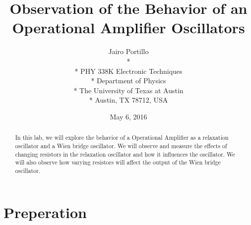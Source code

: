 \documentclass[11pt,letterpaper,onecolumn]{article}
\begin{document}

\title{\bf Observation of the Behavior of an Operational Amplifier Oscillators}

\author{
 Jairo Portillo \\*
  \\*
 PHY 338K Electronic Techniques \\* 
 Department of Physics \\*
 The University of Texas at Austin \\*
 Austin, TX 78712, USA
}
\date{May 6, 2016}


\maketitle


\begin{abstract}

In this lab, we will explore the behavior of a Operational Amplifier as a relaxation oscillator and a Wien bridge oscillator. We will observe and measure the effects of changing resistors in the relaxation oscillator and how it influences the oscillator. We will also observe how varying resistors will affect the output of the Wien bridge oscillator.
\end{abstract}



\section{Preperation}
\end{document}

